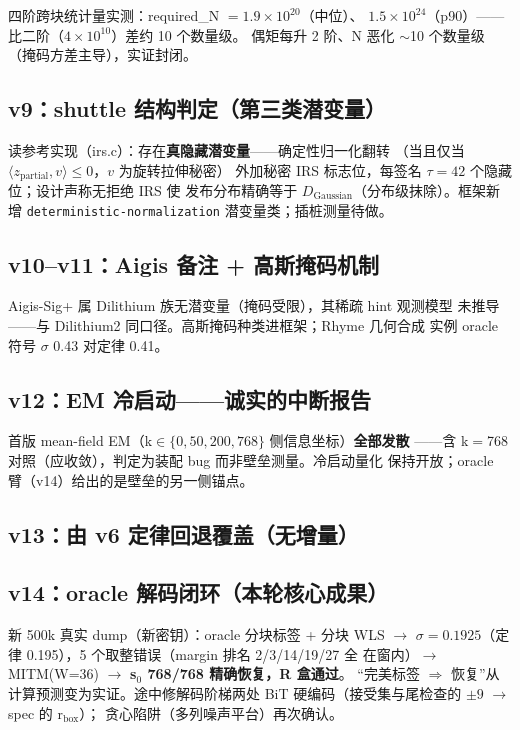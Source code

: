 \documentclass[11pt,a4paper]{ctexart}
\begin{document}
四阶跨块统计量实测：required\_N $=1.9\times10^{20}$（中位）、
$1.5\times10^{24}$（p90）——比二阶（$4\times10^{10}$）差约 10 个数量级。
偶矩每升 2 阶、N 恶化 $\sim$10 个数量级（掩码方差主导），实证封闭。

\subsection{v9：shuttle 结构判定（第三类潜变量）}

读参考实现（irs.c）：存在\textbf{真隐藏潜变量}——确定性归一化翻转
（当且仅当 $\langle z_{\text{partial}},v\rangle\le0$，$v$ 为旋转拉伸秘密）
外加秘密 IRS 标志位，每签名 $\tau{=}42$ 个隐藏位；设计声称无拒绝 IRS 使
发布分布精确等于 $D_{\text{Gaussian}}$（分布级抹除）。框架新增
\texttt{deterministic-normalization} 潜变量类；插桩测量待做。

\subsection{v10--v11：Aigis 备注 + 高斯掩码机制}

Aigis-Sig+ 属 Dilithium 族无潜变量（掩码受限），其稀疏 hint 观测模型
未推导——与 Dilithium2 同口径。高斯掩码种类进框架；Rhyme 几何合成
实例 oracle 符号 $\sigma$ 0.43 对定律 0.41。

\subsection{v12：EM 冷启动——诚实的中断报告}

首版 mean-field EM（k$\in\{0,50,200,768\}$ 侧信息坐标）\textbf{全部发散}
——含 k$=$768 对照（应收敛），判定为装配 bug 而非壁垒测量。冷启动量化
保持开放；oracle 臂（v14）给出的是壁垒的另一侧锚点。

\subsection{v13：由 v6 定律回退覆盖（无增量）}

\subsection{v14：oracle 解码闭环（本轮核心成果）}

新 500k 真实 dump（新密钥）：oracle 分块标签 + 分块 WLS $\to$
$\sigma=0.1925$（定律 0.195），5 个取整错误（margin 排名 2/3/14/19/27 全
在窗内）$\to$ MITM(W=36) $\to$ \textbf{s$_0$ 768/768 精确恢复，R 盒通过}。
``完美标签 $\Rightarrow$ 恢复''从计算预测变为实证。途中修解码阶梯两处
BiT 硬编码（接受集与尾检查的 $\pm9$ $\to$ spec 的 r$_{\text{box}}$）；
贪心陷阱（多列噪声平台）再次确认。
\end{document}
